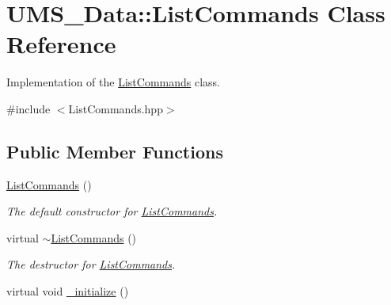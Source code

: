 \hypertarget{classUMS__Data_1_1ListCommands}{
\section{UMS\_\-Data::ListCommands Class Reference}
\label{classUMS__Data_1_1ListCommands}
}


Implementation of the \hyperlink{classUMS__Data_1_1ListCommands}{ListCommands} class.  




{\ttfamily \#include $<$ListCommands.hpp$>$}

\subsection*{Public Member Functions}
\begin{DoxyCompactItemize}
\item 
\hypertarget{classUMS__Data_1_1ListCommands_a5098d86c0ee8a518e3a263a974b465c4}{
\hyperlink{classUMS__Data_1_1ListCommands_a5098d86c0ee8a518e3a263a974b465c4}{ListCommands} ()}
\label{classUMS__Data_1_1ListCommands_a5098d86c0ee8a518e3a263a974b465c4}

\begin{DoxyCompactList}\small\item\em The default constructor for \hyperlink{classUMS__Data_1_1ListCommands}{ListCommands}. \item\end{DoxyCompactList}\item 
\hypertarget{classUMS__Data_1_1ListCommands_a919a8941820d203708e5d009a2f7578c}{
virtual \hyperlink{classUMS__Data_1_1ListCommands_a919a8941820d203708e5d009a2f7578c}{$\sim$ListCommands} ()}
\label{classUMS__Data_1_1ListCommands_a919a8941820d203708e5d009a2f7578c}

\begin{DoxyCompactList}\small\item\em The destructor for \hyperlink{classUMS__Data_1_1ListCommands}{ListCommands}. \item\end{DoxyCompactList}\item 
\hypertarget{classUMS__Data_1_1ListCommands_a7ee87099c52a5b3fa5076e72a047bb31}{
virtual void \hyperlink{classUMS__Data_1_1ListCommands_a7ee87099c52a5b3fa5076e72a047bb31}{\_\-initialize} ()}
\label{classUMS__Data_1_1ListCommands_a7ee87099c52a5b3fa5076e72a047bb31}


\end{DoxyCompactItemize}
